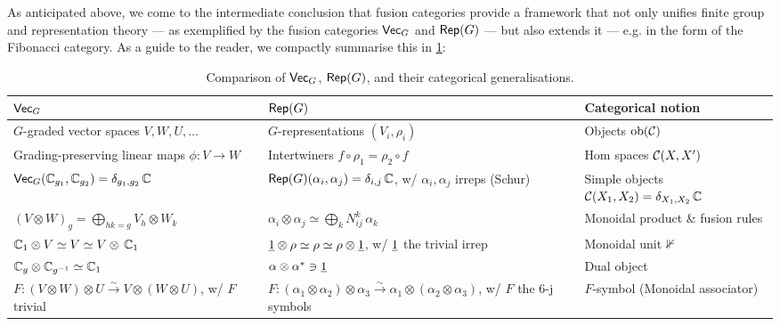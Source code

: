 \bigskip\noindent As anticipated above, we come to the intermediate conclusion that fusion categories provide a framework that not only unifies finite group and representation theory --- as exemplified by the fusion categories $\mathsf{Vec}_G$ and $\mathsf{Rep}(G)$ --- but also extends it --- e.g. in the form of the Fibonacci category. As a guide to the reader, we compactly summarise this in  \cref{tab:categorical}:
\vfill
\begin{table}[h]
	\centering
	\renewcommand{\arraystretch}{2}
	\begin{tabular}{|>{\centering\arraybackslash}p{4cm}
			|>{\centering\arraybackslash}p{4cm}
			|>{\centering\arraybackslash}p{4cm}|}
		\hline
		$\mathsf{Vec}_G$ & $\mathsf{Rep}(G)$ & Categorical notion \\
		\hline
		$G$-graded vector spaces $V, W, U,\dots$
		& $G$-representations $(V_i, \rho_i)$
		& Objects ${\rm ob}(\mathcal{C})$ \\
		\hline
		Grading-preserving linear maps $\phi: V \to W$ 
		& Intertwiners $f \circ \rho_1 = \rho_2 \circ f$ 
		& Hom spaces $\mathcal{C}(X,X')$ \\
		\hline
		$\mathsf{Vec}_G(\mathbb C_{g_1}, \mathbb C_{g_2}) = \delta_{g_1, g_2}\, \mathbb C$
		& $\mathsf{Rep}(G)(\alpha_i, \alpha_j) = \delta_{i,j}\,\mathbb C$, w/ $\alpha_i,\alpha_j$ irreps \;(Schur)
		& Simple objects $\mathcal{C}(X_1,X_2) = \delta_{X_1,X_2}\,\mathbb C$ \\
		\hline
		$(V \otimes W)_g = \bigoplus_{hk=g} V_h \otimes W_k$
		& $\alpha_i \otimes \alpha_j \simeq \bigoplus_k N_{ij}^k\,\alpha_k$
		& Monoidal product \& fusion rules \\
		\hline
		$\mathbb C_1 \otimes V \simeq V \simeq V \otimes\, \mathbb C_1$
		& $\underline 1 \otimes \rho \simeq \rho \simeq \rho \otimes \underline 1$, w/
		$\underline 1$ the trivial irrep
		& Monoidal unit $\mathbb 1$ \\
		\hline
		$\mathbb C_g \otimes \mathbb C_{g^{-1}} \simeq \mathbb C_1$
		& $\alpha \otimes \alpha^* \ni \underline 1$
		& Dual object \\
		\hline
		$F: (V \otimes W) \otimes U \xrightarrow{\sim} V \otimes (W \otimes U)$, w/ $F$ trivial
		& $F: (\alpha_1 \otimes \alpha_2) \otimes \alpha_3 \xrightarrow{\sim} \alpha_1 \otimes (\alpha_2 \otimes \alpha_3)$, w/ $F$ the 6-j symbols
		& $F$-symbol (Monoidal associator) \\
		\hline
	\end{tabular}
	\caption{Comparison of $\mathsf{Vec}_G$, $\mathsf{Rep}(G)$, and their categorical generalisations.}
	\label{tab:categorical}
\end{table}
\vfill
\clearpage

